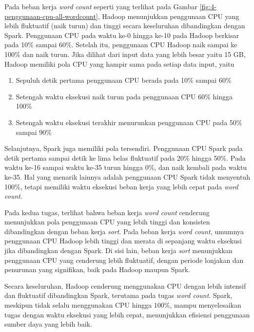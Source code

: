 Pada beban kerja \textit{word count} seperti yang terlihat pada Gambar \ref{fig:4-penggunaan-cpu-all-wordcount}, Hadoop menunjukkan penggunaan CPU yang lebih fluktuatif (naik turun) dan tinggi secara keseluruhan dibandingkan dengan Spark. Penggunaan CPU pada waktu ke-0 hingga ke-10 pada Hadoop berkisar pada 10\% sampai 60\%. Setelah itu, penggunaan CPU Hadoop naik sampai ke 100\% dan naik turun. Jika dilihat dari input data yang lebih besar yaitu 15 GB, Hadoop memiliki pola CPU yang hampir sama pada setiap data input, yaitu 
\begin{enumerate}
\item Sepuluh detik pertama penggunaan CPU berada pada 10\% sampai 60\%
\item Setengah waktu eksekusi naik turun pada penggunaan CPU 60\% hingga 100\%
\item Setengah waktu eksekusi terakhir menurunkan penggunaan CPU pada 50\% sampai 90\%
\end{enumerate}
Selanjutnya, Spark juga memiliki pola tersendiri. Penggunaan CPU Spark pada detik pertama sampai detik ke lima belas fluktuatif pada 20\% hingga 50\%. Pada waktu ke-16 sampai waktu ke-35 turun hingga 0\%, dan naik kembali pada waktu ke-35. Hal yang menarik lainnya adalah penggunaan CPU Spark tidak menyentuh 100\%, tetapi memiliki waktu eksekusi beban kerja yang lebih cepat pada \textit{word count}.

Pada kedua tugas, terlihat bahwa beban kerja \textit{word count} cenderung menunjukkan pola penggunaan CPU yang lebih tinggi dan konsisten dibandingkan dengan beban kerja \textit{sort}. Pada beban kerja \textit{word count}, umumnya penggunaan CPU Hadoop lebih tinggi dan merata di sepanjang waktu eksekusi jika dibandingkan dengan Spark. Di sisi lain, beban kerja \textit{sort} menunjukkan penggunaan CPU yang cenderung lebih fluktuatif, dengan periode lonjakan dan penurunan yang signifikan, baik pada Hadoop maupun Spark.

Secara keseluruhan, Hadoop cenderung menggunakan CPU dengan lebih intensif dan fluktuatif dibandingkan Spark, terutama pada tugas \textit{word count}. Spark, meskipun tidak selalu menggunakan CPU hingga 100\%, mampu menyelesaikan tugas dengan waktu eksekusi yang lebih cepat, menunjukkan efisiensi penggunaan sumber daya yang lebih baik.

